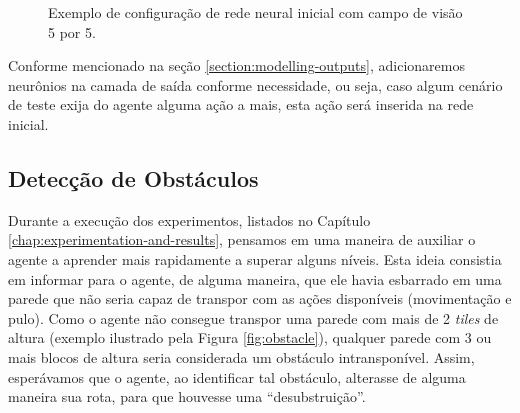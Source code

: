 \begin{figure}[H]
\centering
{}
\caption {\label{fig:modelling-network-example}Exemplo de configuração de rede
	neural inicial com campo de visão 5 por 5.}
\end{figure}

Conforme mencionado na seção \ref{section:modelling-outputs}, adicionaremos
neurônios na camada de saída conforme necessidade, ou seja, caso algum cenário
de teste exija do agente alguma ação a mais, esta ação será inserida na rede
inicial.

\subsection{\label{section:obstacle-input}Detecção de Obstáculos}
Durante a execução dos experimentos, listados no Capítulo
\ref{chap:experimentation-and-results}, pensamos em uma maneira de auxiliar o
agente a aprender mais rapidamente a superar alguns níveis. Esta ideia consistia
em informar para o agente, de alguma maneira, que ele havia esbarrado em uma
parede que não seria capaz de transpor com as ações disponíveis (movimentação e
pulo). Como o agente não consegue transpor uma parede com mais de 2 
\textit{tiles} de altura (exemplo ilustrado pela Figura \ref{fig:obstacle}),
qualquer parede com 3 ou mais blocos de altura seria considerada um obstáculo
intransponível. Assim, esperávamos que o agente, ao identificar tal obstáculo,
alterasse de alguma maneira sua rota, para que houvesse uma ``desubstruição''.

